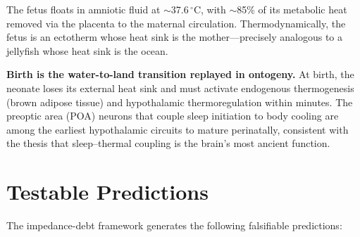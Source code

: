 ﻿\documentclass[aps,pre,twocolumn,superscriptaddress,floatfix]{revtex4-2}
\begin{document}
The fetus floats in amniotic fluid at
$\sim$37.6$\,^{\circ}$C, with $\sim$85\%
of its metabolic heat removed via the placenta
to the maternal circulation.
Thermodynamically, the fetus is an ectotherm
whose heat sink is the mother---precisely analogous
to a jellyfish whose heat sink is the ocean.

\textbf{Birth is the water-to-land transition
replayed in ontogeny.}
At birth, the neonate loses its external heat sink
and must activate endogenous thermogenesis
(brown adipose tissue) and hypothalamic thermoregulation
within minutes.
The preoptic area (POA) neurons that couple
sleep initiation to body cooling are among the
earliest hypothalamic circuits to mature perinatally,
consistent with the thesis that sleep--thermal coupling
is the brain's most ancient function.


\section{Testable Predictions}
\label{sec:predictions}

The impedance-debt framework generates the following
falsifiable predictions:
\end{document}
